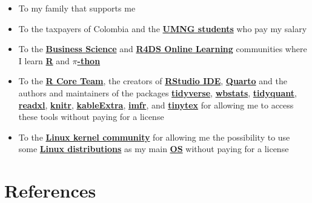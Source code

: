 \documentclass[
  ignorenonframetext,
]{beamer}
\begin{document}
\begin{frame}{}
\label{section-19}
\begin{itemize}
\item
  To my family that supports me
\item
  To the taxpayers of Colombia and the
  \href{https://www.umng.edu.co/estudiante}{\textbf{UMNG students}} who
  pay my salary
\item
  To the \href{https://www.business-science.io/}{\textbf{Business
  Science}} and \href{https://www.rfordatasci.com/}{\textbf{R4DS Online
  Learning}} communities where I learn
  \href{https://www.r-project.org/about.html}{\textbf{R}} and
  \href{https://www.python.org/about/}{\textbf{\(\pi\)-thon}}
\item
  To the \href{https://www.r-project.org/contributors.html}{\textbf{R
  Core Team}}, the creators of
  \href{https://rstudio.com/products/rstudio/}{\textbf{RStudio IDE}},
  \href{https://quarto.org/}{\textbf{Quarto}} and the authors and
  maintainers of the packages
  \href{https://CRAN.R-project.org/package=tidyverse}{\textbf{tidyverse}},
  \href{https://CRAN.R-project.org/package=wbstats}{\textbf{wbstats}},
  \href{https://CRAN.R-project.org/package=tidyquant}{\textbf{tidyquant}},
  \href{https://CRAN.R-project.org/package=readxl}{\textbf{readxl}},
  \href{https://CRAN.R-project.org/package=knitr}{\textbf{knitr}},
  \href{https://CRAN.R-project.org/package=kableExtra}{\textbf{kableExtra}},
  \href{https://CRAN.R-project.org/package=imfr}{\textbf{imfr}}, and
  \href{https://CRAN.R-project.org/package=tinytex}{\textbf{tinytex}}
  for allowing me to access these tools without paying for a license
\item
  To the \href{https://www.kernel.org/category/about.html}{\textbf{Linux
  kernel community}} for allowing me the possibility to use some
  \href{https://static.lwn.net/Distributions/}{\textbf{Linux
  distributions}} as my main
  \href{https://en.wikipedia.org/wiki/Operating_system}{\textbf{OS}}
  without paying for a license
\end{itemize}
\end{frame}

\section*{References}\label{references}
\end{document}
